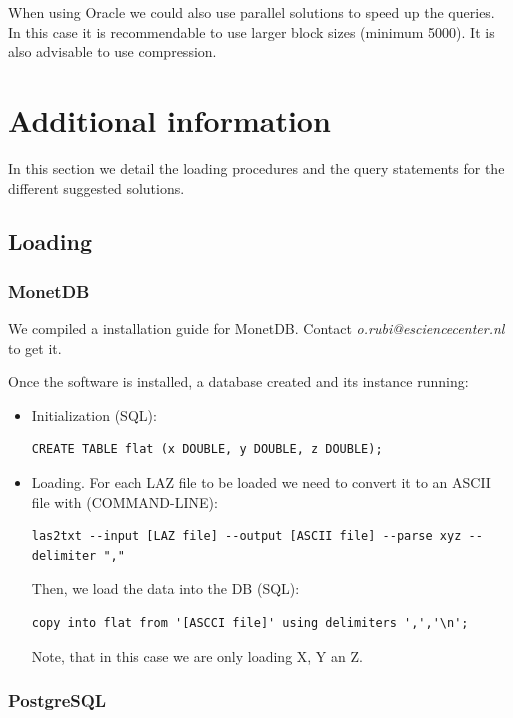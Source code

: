 \documentclass[a4paper,11pt]{article}
\begin{document}
When using Oracle we could also use parallel solutions to speed up the queries. In this case it is recommendable to use larger block sizes (minimum 5000). It is also advisable to use compression.

\section{Additional information}

In this section we detail the loading procedures and the query statements for the different suggested solutions.

\subsection{Loading}

\subsubsection{MonetDB}

We compiled a installation guide for MonetDB. Contact \textit{o.rubi@esciencecenter.nl} to get it. 

Once the software is installed, a database created and its instance running: 

\begin{itemize}

	\item Initialization (SQL):
\begin{verbatim}
CREATE TABLE flat (x DOUBLE, y DOUBLE, z DOUBLE);
\end{verbatim}
	\item Loading. For each LAZ file to be loaded we need to convert it to an ASCII file with (COMMAND-LINE):
	\begin{verbatim}
las2txt --input [LAZ file] --output [ASCII file] --parse xyz --delimiter ","	
	\end{verbatim}
Then, we load the data into the DB (SQL):
\begin{verbatim}
copy into flat from '[ASCCI file]' using delimiters ',','\n';
\end{verbatim}

Note, that in this case we are only loading X, Y an Z.

\end{itemize}

\subsubsection{PostgreSQL}
\end{document}

